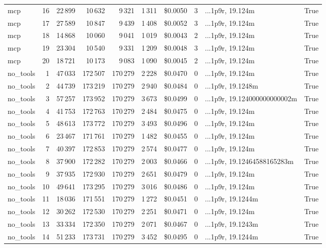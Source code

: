 \documentclass[a4paper,11pt]{article}
\begin{document}
\begin{table}[H]
{\begin{tabular}{l r r r r r r r l r}
mcp & 16 & 22\,899 & 10\,632 & 9\,321 & 1\,311 & \$0.0050 & 3 & ...1p9r, 19.124m & True \\
mcp & 17 & 27\,589 & 10\,847 & 9\,439 & 1\,408 & \$0.0052 & 3 & ...1p9r, 19.124m & True \\
mcp & 18 & 14\,868 & 10\,060 & 9\,041 & 1\,019 & \$0.0043 & 2 & ...1p9r, 19.124m & True \\
mcp & 19 & 23\,304 & 10\,540 & 9\,331 & 1\,209 & \$0.0048 & 3 & ...1p9r, 19.124m & True \\
mcp & 20 & 18\,721 & 10\,173 & 9\,083 & 1\,090 & \$0.0045 & 2 & ...1p9r, 19.124m & True \\
\midrule
no\_tools & 1 & 47\,033 & 172\,507 & 170\,279 & 2\,228 & \$0.0470 & 0 & ...1p9r, 19.124m & True \\
no\_tools & 2 & 44\,739 & 173\,219 & 170\,279 & 2\,940 & \$0.0484 & 0 & ...1p9r, 19.1248m & True \\
no\_tools & 3 & 57\,257 & 173\,952 & 170\,279 & 3\,673 & \$0.0499 & 0 & ...1p9r, 19.124000000000002m & True \\
no\_tools & 4 & 41\,753 & 172\,763 & 170\,279 & 2\,484 & \$0.0475 & 0 & ...1p9r, 19.124m & True \\
no\_tools & 5 & 48\,613 & 173\,772 & 170\,279 & 3\,493 & \$0.0496 & 0 & ...1p9r, 19.124m & True \\
no\_tools & 6 & 23\,467 & 171\,761 & 170\,279 & 1\,482 & \$0.0455 & 0 & ...1p9r, 19.124m & True \\
no\_tools & 7 & 40\,397 & 172\,853 & 170\,279 & 2\,574 & \$0.0477 & 0 & ...1p9r, 19.124m & True \\
no\_tools & 8 & 37\,900 & 172\,282 & 170\,279 & 2\,003 & \$0.0466 & 0 & ...1p9r, 19.12464588165283m & True \\
no\_tools & 9 & 37\,935 & 172\,930 & 170\,279 & 2\,651 & \$0.0479 & 0 & ...1p9r, 19.124m & True \\
no\_tools & 10 & 49\,641 & 173\,295 & 170\,279 & 3\,016 & \$0.0486 & 0 & ...1p9r, 19.124m & True \\
no\_tools & 11 & 18\,036 & 171\,551 & 170\,279 & 1\,272 & \$0.0451 & 0 & ...1p9r, 19.1244m & True \\
no\_tools & 12 & 30\,262 & 172\,530 & 170\,279 & 2\,251 & \$0.0471 & 0 & ...1p9r, 19.124m & True \\
no\_tools & 13 & 33\,334 & 172\,350 & 170\,279 & 2\,071 & \$0.0467 & 0 & ...1p9r, 19.1243m & True \\
no\_tools & 14 & 51\,233 & 173\,731 & 170\,279 & 3\,452 & \$0.0495 & 0 & ...1p9r, 19.1244m & True \\

\end{tabular}}
\end{table}
\end{document}
